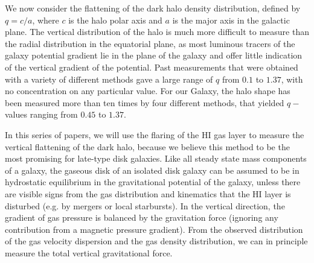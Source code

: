 \documentclass[traditabstract]{aa} %
\begin{document}
We now consider the flattening of the dark halo density distribution,
defined by $q=c/a$, where $c$ is the halo polar axis and $a$ is the
major axis in the galactic plane.  The vertical distribution of the
halo is much more difficult to measure than the radial distribution
in the equatorial plane, as most luminous tracers of the galaxy
potential gradient lie in the plane of the galaxy and offer little 
indication of the vertical gradient of the potential.  Past measurements 
that were obtained
with a variety of different methods gave a large range of $q$ from $0.1$ to
$1.37$, with no concentration on any particular value.  For
our Galaxy, the halo shape has been measured more than ten times
by four different methods, that yielded $q-$values ranging from $0.45$ to
$1.37$.

In this series of papers, we will use the flaring
of the HI gas layer to measure the vertical flattening of the dark halo, 
because we believe this method to be the most promising for
late-type disk galaxies.  Like all steady state mass components
of a galaxy, the gaseous disk of an isolated disk galaxy can be
assumed to be in hydrostatic equilibrium in the gravitational
potential of the galaxy, unless there are visible signs from the
gas distribution and kinematics that the HI layer is disturbed
(e.g. by mergers or local starbursts). In the vertical direction,
the gradient of gas pressure is balanced by the 
gravitation force (ignoring any contribution from
a magnetic pressure gradient). From the observed distribution of the gas velocity
dispersion and the gas density distribution, we can in principle
measure the total vertical gravitational force.
\end{document}
